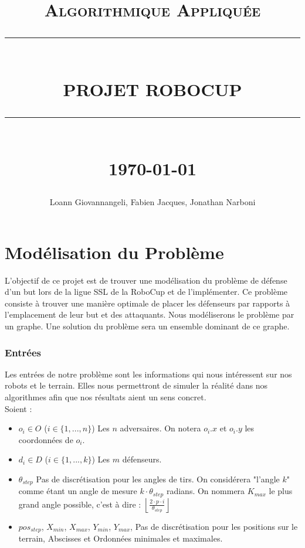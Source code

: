 \documentclass[12pt]{article}
\newcommand{\HRule}[1]{\rule{\linewidth}{#1}}
\begin{document}
\title{ \normalsize \textsc{Algorithmique Appliquée}
		\\ [2.0cm]
		\HRule{0.5pt} \\
		\LARGE \textbf{\uppercase{Projet RoboCup}}
		\HRule{2pt} \\ [0.5cm]
		\normalsize \today \vspace*{5\baselineskip}}

\date{}

\author{
		Loann Giovannangeli, Fabien Jacques, Jonathan Narboni}

\maketitle
\renewcommand{\contentsname}{Sommaire}
\newpage
\tableofcontents
\newpage

\sectionfont{\scshape}

\part{Modélisation du Problème}

L'objectif de ce projet est de trouver une modélisation du problème de défense d'un but lors de la ligue SSL de la RoboCup et de l'implémenter. Ce problème consiste à trouver une manière optimale de placer les défenseurs par rapports à l'emplacement de leur but et des attaquants. Nous modéliserons le problème par un graphe. Une solution du problème sera un ensemble dominant de ce graphe.


\section{Entrées}
Les entrées de notre problème sont les informations qui nous intéressent sur nos robots et le terrain. Elles nous permettront de simuler la réalité dans nos algorithmes afin que nos résultats aient un sens concret.\\

Soient :
\begin{itemize}
\item $o_i \in O$ ($i \in \{1,..., n\}$) Les $n$ adversaires. On notera $o_i.x$ et $o_i.y$ les coordonnées de $o_i$.
\item $d_i \in D$ ($i \in \{1,..., k\}$) Les $m$ défenseurs.
\item $\theta_{step}$ Pas de discrétisation pour les angles de tirs. On considérera "l'angle $k$" comme étant un angle de mesure $k \cdot \theta_{step}$ radians. On nommera $K_{max}$ le plus grand angle possible, c'est à dire :  $\left \lfloor{\frac{2\cdot p \cdot i }{\theta_{step}}}\right \rfloor $
\item $pos_{step}$, $X_{min}$, $X_{max}$, $Y_{min}$, $Y_{max}$, Pas de discrétisation pour les positions sur le terrain, Abscisses et Ordonnées minimales et maximales.
\end{itemize}
\end{document}
